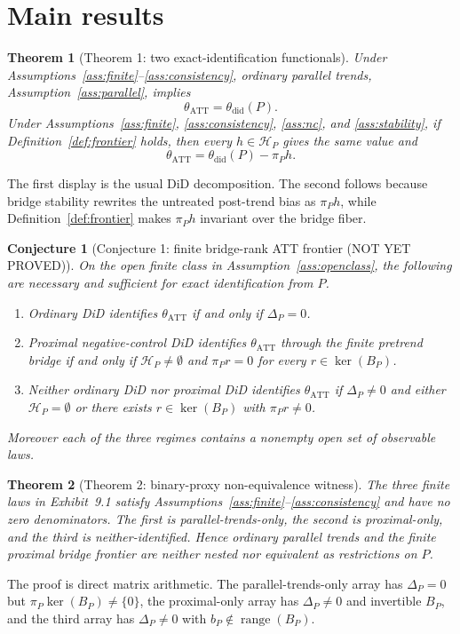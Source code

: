 \documentclass[11pt]{article}
\theoremstyle{definition}
\theoremstyle{plain}
\newtheorem{theorem}{Theorem}
\newtheorem{conjecture}{Conjecture}
\theoremstyle{remark}
\begin{document}
\section{Main results}
\begin{theorem}[Theorem 1: two exact-identification functionals]\label{thm:functionals}
Under Assumptions~\ref{ass:finite}--\ref{ass:consistency}, ordinary parallel trends, Assumption~\ref{ass:parallel}, implies
\[
\theta_{\mathrm{ATT}}=\theta_{\mathrm{did}}(P).
\]
Under Assumptions~\ref{ass:finite}, \ref{ass:consistency}, \ref{ass:nc}, and \ref{ass:stability}, if Definition~\ref{def:frontier} holds, then every \(h\in\mathcal H_P\) gives the same value and
\[
\theta_{\mathrm{ATT}}=\theta_{\mathrm{did}}(P)-\pi_Ph.
\]
\end{theorem}
The first display is the usual DiD decomposition.  The second follows because bridge stability rewrites the untreated post-trend bias as \(\pi_Ph\), while Definition~\ref{def:frontier} makes \(\pi_Ph\) invariant over the bridge fiber.

\begin{conjecture}[Conjecture 1: finite bridge-rank ATT frontier (NOT YET PROVED)]\label{conj:frontier}
On the open finite class in Assumption~\ref{ass:openclass}, the following are necessary and sufficient for exact identification from \(P\).
\begin{enumerate}[label=(\roman*)]
\item Ordinary DiD identifies \(\theta_{\mathrm{ATT}}\) if and only if \(\Delta_P=0\).
\item Proximal negative-control DiD identifies \(\theta_{\mathrm{ATT}}\) through the finite pretrend bridge if and only if \(\mathcal H_P\neq\emptyset\) and \(\pi_Pr=0\) for every \(r\in\operatorname{ker}(B_P)\).
\item Neither ordinary DiD nor proximal DiD identifies \(\theta_{\mathrm{ATT}}\) if \(\Delta_P\neq0\) and either \(\mathcal H_P=\emptyset\) or there exists \(r\in\operatorname{ker}(B_P)\) with \(\pi_Pr\neq0\).
\end{enumerate}
Moreover each of the three regimes contains a nonempty open set of observable laws.
\end{conjecture}

\begin{theorem}[Theorem 2: binary-proxy non-equivalence witness]\label{thm:witness}
The three finite laws in Exhibit~9.1 satisfy Assumptions~\ref{ass:finite}--\ref{ass:consistency} and have no zero denominators.  The first is parallel-trends-only, the second is proximal-only, and the third is neither-identified.  Hence ordinary parallel trends and the finite proximal bridge frontier are neither nested nor equivalent as restrictions on \(P\).
\end{theorem}
The proof is direct matrix arithmetic.  The parallel-trends-only array has \(\Delta_P=0\) but \(\pi_P\operatorname{ker}(B_P)\neq\{0\}\), the proximal-only array has \(\Delta_P\neq0\) and invertible \(B_P\), and the third array has \(\Delta_P\neq0\) with \(b_P\notin\operatorname{range}(B_P)\).
\end{document}
